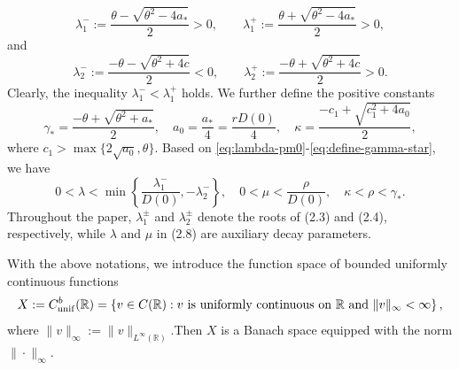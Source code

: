 \documentclass[preprint,sort&compress,final,12pt]{elsarticle}
\numberwithin{equation}{section}
\begin{document}
\begin{equation}\label{eq:lambda-pm0}
\lambda_1^-:=\frac{\theta-\sqrt{\theta^2-4a_*}}{2}>0,\qquad\lambda_1^+:=\frac{\theta+\sqrt{\theta^2-4a_*}}{2}>0,
\end{equation}
and
\begin{equation}\label{eq:lambda-pm}
\lambda_2^-:=\frac{-\theta-\sqrt{\theta^2+4c}}{2}<0,\qquad\lambda_2^+:=\frac{-\theta+\sqrt{\theta^2+4c}}{2}>0.
\end{equation}
Clearly, the inequality $ \lambda_1^-<\lambda_1^+$ holds. We further define the positive constants
\begin{equation}\label{eq:define-gamma-star}
\gamma_*=\frac{-\theta+\sqrt{\theta^2+a_*}}{2},\quad a_0=\frac{a_*}{4}=\frac{rD(0)}{4},\quad \kappa=\frac{-c_1+\sqrt{c_1^2+4a_0}}{2},
\end{equation}
where $c_1>\max\{2\sqrt{a_0},\theta\}$. Based on \eqref{eq:lambda-pm0}-\eqref{eq:define-gamma-star}, we  have 
\begin{equation}\label{eq:lambda-choice}
0<\lambda<\min\left\{\frac{ \lambda_1^-}{D(0)},-\lambda_2^-\right\},\quad0<\mu<\frac{\rho}{D(0)},\quad\kappa <\rho<\gamma_*.
\end{equation}
Throughout the paper, $\lambda_1^\pm$ and $\lambda_2^\pm$ denote the roots of (2.3) and (2.4), respectively, while $\lambda$ and $\mu$ in (2.8) are auxiliary decay parameters.


With the above notations, we introduce the function space of bounded uniformly continuous functions
\begin{equation*}
X:=C^b_{\mathrm{unif}}(\mathbb R)=\left\{v\in C(\mathbb R): v\hbox{ is uniformly continuous on }\mathbb R
\hbox{ and }\|v\|_\infty<\infty\right\},
\end{equation*}
where $\|v\|_\infty:=\|v\|_{L^\infty(\mathbb R)}$.Then $X$ is a Banach space equipped with the norm $\|\cdot\|_\infty$.
\end{document}
